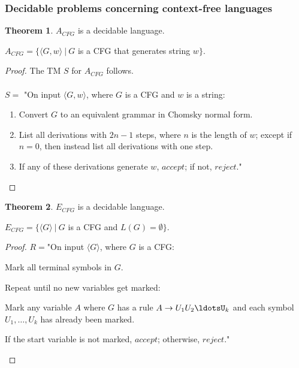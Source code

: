 \documentclass[11pt]{article}
\theoremstyle{definition}
\newtheorem{thm}{Theorem}[section]
\begin{document}
\subsubsection{Decidable problems concerning context-free languages}
\begin{thm}
    $A_{CFG}$ is a decidable language.
    \begin{center}
        $A_{CFG} = \{\langle G,w\rangle\ |\ G$ is a CFG that generates string $w\}$.
    \end{center}
\end{thm}
\begin{proof}
   The TM $S$ for $A_{CFG}$ follows.\\\\
$S =$ "On input $\langle G,w\rangle$, where $G$ is a CFG and $w$ is a string:
\begin{enumerate}
    \item Convert $G$ to an equivalent grammar in Chomsky normal form.
    \item List all derivations with $2n - 1$ steps, where $n$ is the length of $w$;
except if $n = 0$, then instead list all derivations with one step.
\item If any of these derivations generate $w$, $accept$; if not, $reject$."
\end{enumerate}
\end{proof}

\begin{thm}
    $E_{CFG}$ is a decidable language.
    \begin{center}
        $E_{CFG} = \{\langle G\rangle\ |\ G$ is a CFG and $L(G)=\emptyset\}$.
    \end{center}
\end{thm}
\begin{proof}
    $R =$"On input $\langle G\rangle$, where $G$ is a CFG:
    \begin{enumerate}
        \item Mark all terminal symbols in $G$.
        \item Repeat until no new variables get marked:
        {\setlength\itemindent{25pt}\item Mark any variable $A$ where $G$ has a rule $A\to U_1U_2\ldotsU_k$ and each symbol $U_1,\ldots,U_k$ has already been marked.}
        \item If the start variable is not marked, $accept$; otherwise, $reject$."
    \end{enumerate}
\end{proof}
\end{document}
